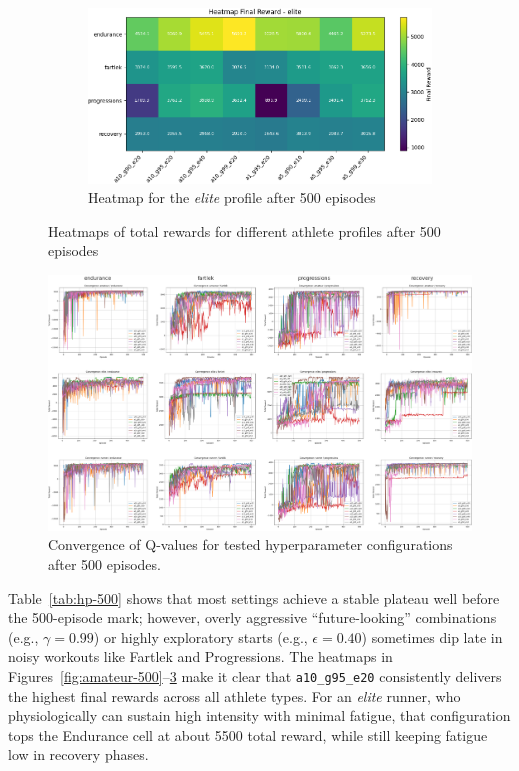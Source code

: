 \begin{figure}[!htbp]
\begin{subfigure}[t]{0.90\textwidth}
    \label{fig:runner-500}
    \end{subfigure}
    \begin{subfigure}[t]{0.90\textwidth}
        \centering
        \includegraphics[width=\textwidth]{images/heatmap_final_elite_500.png}
        \caption{Heatmap for the \textit{elite} profile after 500 episodes}
    \label{fig:elite-500}
    \end{subfigure}
    \caption{Heatmaps of total rewards for different athlete profiles after 500 episodes}
\end{figure}

\begin{figure}[!htbp]
    \centering
    \includegraphics[width=1\textwidth]{images/convergence_grid_500_custom.png}
    \caption{Convergence of Q-values for tested hyperparameter configurations after 500 episodes.}
    \label{fig:convergence-500}
\end{figure}


Table~\ref{tab:hp-500} shows that most settings achieve a stable plateau well before the 500-episode mark; however, overly aggressive ``future-looking'' combinations (e.g., $\gamma = 0.99$) or highly exploratory starts (e.g., $\epsilon = 0.40$) sometimes dip late in noisy workouts like Fartlek and Progressions. The heatmaps in Figures~\ref{fig:amateur-500}--\ref{fig:elite-500} make it clear that \texttt{a10\_g95\_e20} consistently delivers the highest final rewards across all athlete types. For an \textit{elite} runner, who physiologically can sustain high intensity with minimal fatigue, that configuration tops the Endurance cell at about 5500 total reward, while still keeping fatigue low in recovery phases.

